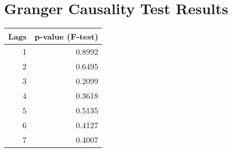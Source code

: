 \documentclass{article}
\begin{document}
\section*{Granger Causality Test Results}

\begin{tabular}{rr}
\hline
   Lags &   p-value (F-test) \\
\hline
      1 &             0.8992 \\
      2 &             0.6495 \\
      3 &             0.2099 \\
      4 &             0.3618 \\
      5 &             0.5135 \\
      6 &             0.4127 \\
      7 &             0.4007 \\
\hline
\end{tabular}
\end{document}

